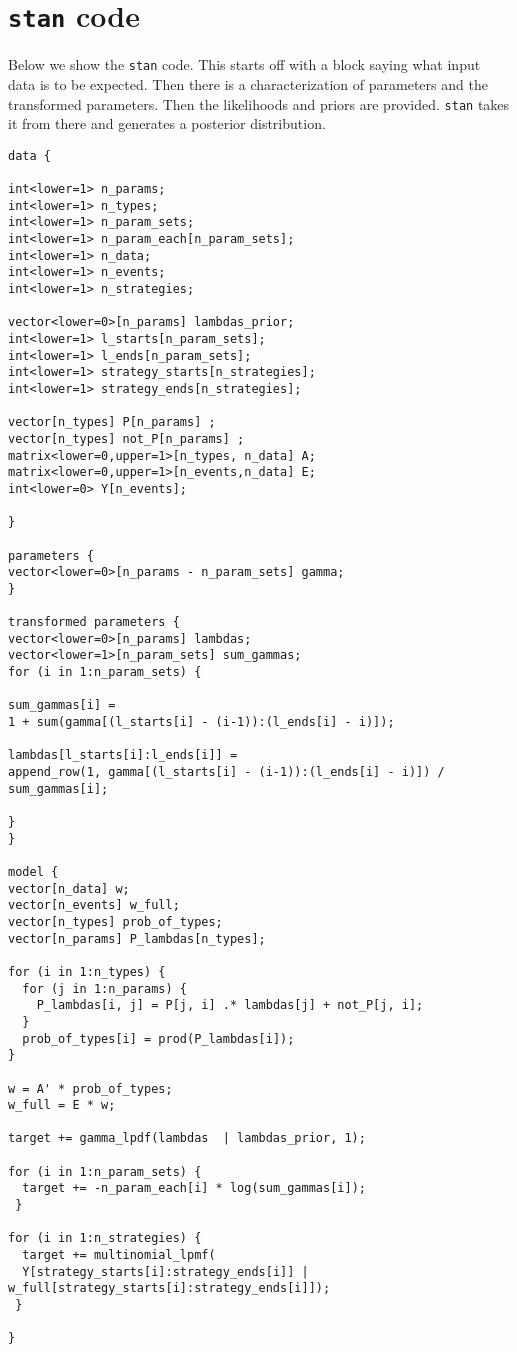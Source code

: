 \documentclass[
  12pt,
]{book}
\begin{document}
\hypertarget{stan-code}{%
\section{\texorpdfstring{\texttt{stan} code}{stan code}}\label{stan-code}}

Below we show the \texttt{stan} code. This starts off with a block saying what input data is to be expected. Then there is a characterization of parameters and the transformed parameters. Then the likelihoods and priors are provided. \texttt{stan} takes it from there and generates a posterior distribution.

\begin{verbatim}
data {

int<lower=1> n_params;
int<lower=1> n_types;
int<lower=1> n_param_sets;
int<lower=1> n_param_each[n_param_sets];
int<lower=1> n_data;
int<lower=1> n_events;
int<lower=1> n_strategies;

vector<lower=0>[n_params] lambdas_prior;
int<lower=1> l_starts[n_param_sets];
int<lower=1> l_ends[n_param_sets];
int<lower=1> strategy_starts[n_strategies];
int<lower=1> strategy_ends[n_strategies];

vector[n_types] P[n_params] ;
vector[n_types] not_P[n_params] ;
matrix<lower=0,upper=1>[n_types, n_data] A;
matrix<lower=0,upper=1>[n_events,n_data] E;
int<lower=0> Y[n_events];

}

parameters {
vector<lower=0>[n_params - n_param_sets] gamma;
}

transformed parameters {
vector<lower=0>[n_params] lambdas;
vector<lower=1>[n_param_sets] sum_gammas;
for (i in 1:n_param_sets) {

sum_gammas[i] =
1 + sum(gamma[(l_starts[i] - (i-1)):(l_ends[i] - i)]);

lambdas[l_starts[i]:l_ends[i]] =
append_row(1, gamma[(l_starts[i] - (i-1)):(l_ends[i] - i)]) / sum_gammas[i];

}
}

model {
vector[n_data] w;
vector[n_events] w_full;
vector[n_types] prob_of_types;
vector[n_params] P_lambdas[n_types];

for (i in 1:n_types) {
  for (j in 1:n_params) {
    P_lambdas[i, j] = P[j, i] .* lambdas[j] + not_P[j, i];
  }
  prob_of_types[i] = prod(P_lambdas[i]);
}

w = A' * prob_of_types;
w_full = E * w;

target += gamma_lpdf(lambdas  | lambdas_prior, 1);

for (i in 1:n_param_sets) {
  target += -n_param_each[i] * log(sum_gammas[i]);
 }

for (i in 1:n_strategies) {
  target += multinomial_lpmf(
  Y[strategy_starts[i]:strategy_ends[i]] | w_full[strategy_starts[i]:strategy_ends[i]]);
 }

}
\end{verbatim}
\end{document}
